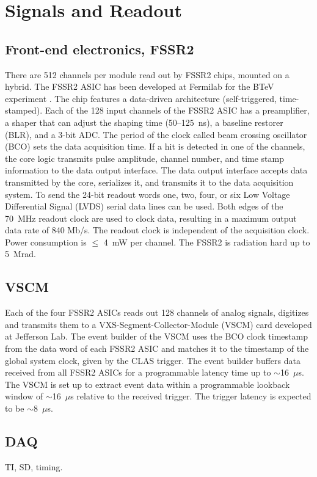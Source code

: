 \section{Signals and Readout}

\subsection{Front-end electronics, FSSR2}

There are 512 channels per module read out by FSSR2 chips, mounted on a hybrid. The FSSR2 ASIC has been developed at Fermilab for the BTeV experiment \cite{FSSR}. The chip features a data-driven architecture (self-triggered, time-stamped). Each of the 128 input channels of the FSSR2 ASIC has a preamplifier, a shaper that can adjust the shaping time (50--125~ns), a baseline restorer (BLR), and a 3-bit ADC. The period of the clock called beam crossing oscillator (BCO) sets the data acquisition time. If a hit is detected in one of the channels, the core logic transmits pulse amplitude, channel number, and time stamp information to the data output interface. The data output interface accepts data transmitted by the core, serializes it, and transmits it to the data acquisition system. To send the 24-bit readout words one, two, four, or six Low Voltage Differential Signal (LVDS) serial data lines can be used. Both edges of the 70~MHz readout clock are used to clock data, resulting in a maximum output data rate of 840 Mb/s. The readout clock is independent of the acquisition clock. Power consumption is $\le$ 4~mW per channel. The FSSR2 is radiation hard up to 5~Mrad. 

\subsection{VSCM}
Each of the four FSSR2 ASICs reads out 128 channels of analog signals, digitizes and transmits them to a VXS-Segment-Collector-Module (VSCM) card developed at Jefferson Lab. The event builder of the VSCM uses the BCO clock timestamp from the data word of each FSSR2 ASIC and matches it to the timestamp of the global system clock, given by the CLAS trigger. The event builder buffers data received from all FSSR2 ASICs for a programmable latency time up to $\sim$16~$\mu$s. The VSCM is set up to extract event data within a programmable lookback window of $\sim$16~$\mu$s relative to the received trigger. The trigger latency is expected to be $\sim$8~$\mu$s.

\subsection{DAQ}
TI, SD, timing.
